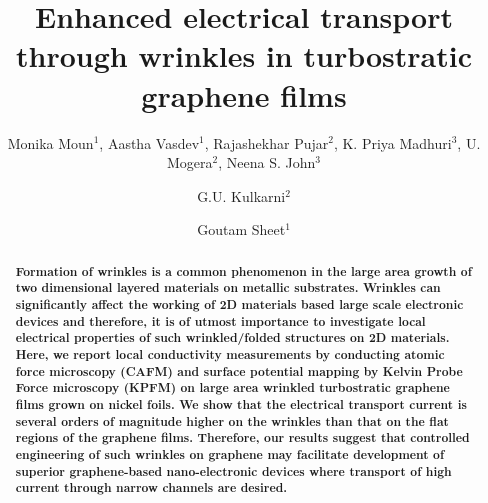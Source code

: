 \documentclass[preprint,aps,preprint,amsmath,amssymb]{revtex4-1}
\begin{document}
\title{Enhanced electrical transport through wrinkles in turbostratic graphene films}

\author{Monika Moun$^1$, Aastha Vasdev$^1$, Rajashekhar Pujar$^2$, K. Priya Madhuri$^3$, U. Mogera$^2$, Neena S. John$^3$}


\author{G.U. Kulkarni$^2$}
\author{Goutam Sheet$^1$}




\begin{abstract}

\textbf{Formation of wrinkles is a common phenomenon in the large area growth of two dimensional layered materials on metallic substrates. Wrinkles can significantly affect the working of 2D materials based large scale electronic devices and therefore, it is of utmost importance to investigate local electrical properties of such wrinkled/folded structures on 2D materials. Here, we report local conductivity measurements by conducting atomic force microscopy (CAFM) and surface potential mapping by Kelvin Probe Force microscopy (KPFM) on large area wrinkled turbostratic graphene films grown on nickel foils. We show that the electrical transport current is several orders of magnitude higher on the wrinkles than that on the flat regions of the graphene films. Therefore, our results suggest that controlled engineering of such wrinkles on graphene may facilitate development of superior graphene-based nano-electronic devices where transport of high current through narrow channels are desired.}

	
\end{abstract}


\maketitle
\end{document}
